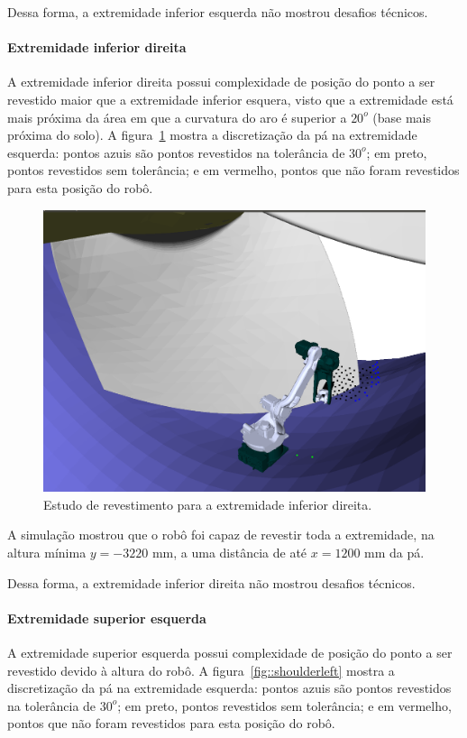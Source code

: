 Dessa forma, a extremidade inferior esquerda não mostrou desafios técnicos.

\paragraph{Extremidade inferior direita}

A extremidade inferior direita possui complexidade de posição do ponto a
ser revestido maior que a extremidade inferior esquera, visto que a extremidade
está mais próxima da área em que a curvatura do aro é superior a $20^o$ (base
mais próxima do solo). A figura~\ref{fig::footright} mostra a discretização da
pá na extremidade esquerda: pontos azuis são pontos revestidos na tolerância de
$30^o$; em preto, pontos revestidos sem tolerância; e em vermelho, pontos que
não foram revestidos para esta posição do robô.

\begin{figure}[!ht]
	\centering	
	\includegraphics[width=.5\columnwidth]{figs/footright.png}
	\caption{Estudo de revestimento para a extremidade inferior direita.}
	\label{fig::footright}
\end{figure}

A simulação mostrou que o robô foi capaz de revestir toda a extremidade, na
altura mínima $y=-3220$ mm, a uma distância de até $x=1200$ mm da pá. 

Dessa forma, a extremidade inferior direita não mostrou desafios técnicos.

\paragraph{Extremidade superior esquerda}\label{superioresquerda}

A extremidade superior esquerda possui complexidade de posição do ponto a
ser revestido devido à altura do robô. A figura~\ref{fig::shoulderleft} mostra
a discretização da pá na extremidade esquerda: pontos azuis são pontos revestidos na tolerância de
$30^o$; em preto, pontos revestidos sem tolerância; e em vermelho, pontos que
não foram revestidos para esta posição do robô.

